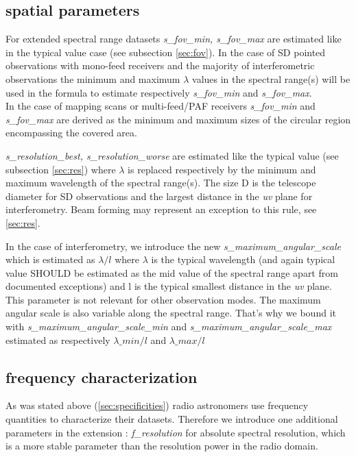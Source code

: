 \documentclass[11pt,a4paper]{ivoa}
\begin{document}
\subsection{spatial parameters}

For extended spectral range datasets \emph{s\_fov\_min, s\_fov\_max} are estimated like in the typical value case (see subsection \ref{sec:fov}).  
In the case of SD pointed observations with mono-feed receivers and the majority of interferometric observations the minimum and maximum
$\lambda$ values in the spectral range(s) will be used in the formula to estimate respectively \emph{s\_fov\_min} and  \emph{s\_fov\_max}. \\
In the case of mapping scans or multi-feed/PAF receivers \emph{ s\_fov\_min} and \emph{s\_fov\_max} are derived as the minimum and maximum sizes of the 
circular region encompassing the covered area.


\emph{s\_resolution\_best, s\_resolution\_worse} are estimated like the typical value (see subsection \ref{sec:res}) where $\lambda$ is replaced respectively by the minimum and maximum wavelength of the spectral range(s). The size D is the telescope diameter for SD observations and the largest distance in the \emph{uv} plane for interferometry. Beam forming may represent an exception to this rule, see \ref{sec:res}.

In the case of interferometry, we introduce the new \emph{s\_maximum\_angular\_scale} which is estimated as $\lambda/l$ where $\lambda$ is the typical
wavelength (and again typical value SHOULD be estimated as the mid value of the spectral range apart from documented exceptions) and l is the typical smallest distance in the \emph{uv} plane. This parameter is not relevant for other observation modes.
The maximum angular scale is also variable along the spectral range. That's why we bound it with \emph{s\_maximum\_angular\_scale\_min} and \emph{s\_maximum\_angular\_scale\_max} estimated as  respectively $\lambda\_min/l$ and  $\lambda\_max/l$



\subsection{frequency characterization}

As was stated above (\ref{sec:specificities}) radio astronomers use frequency quantities to characterize their datasets. Therefore we introduce one additional parameters in the extension : 
\emph{f\_resolution} for absolute spectral resolution, which is a more stable parameter than the resolution power in the radio domain.
\end{document}
